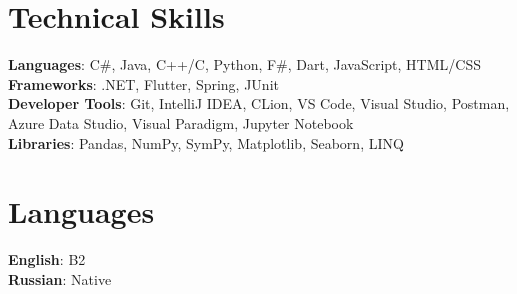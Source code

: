 \documentclass[letterpaper,11pt]{article}
\begin{document}

%
\section{Technical Skills}
 \begin{itemize}[leftmargin=0.15in, label={}]
    \small{\item{
     \textbf{Languages}{: C\#, Java, C++/C, Python, F\#, Dart, JavaScript, HTML/CSS} \\
     \textbf{Frameworks}{: .NET, Flutter, Spring, JUnit} \\
     \textbf{Developer Tools}{: Git, IntelliJ IDEA, CLion, VS Code, Visual Studio, Postman, Azure Data Studio, Visual Paradigm, Jupyter Notebook} \\
     \textbf{Libraries}{: Pandas, NumPy, SymPy, Matplotlib, Seaborn, LINQ}
    }}
 \end{itemize}

\section{Languages}
 \begin{itemize}[leftmargin=0.15in, label={}]
    \small{\item{
     \textbf{English}{: B2} \\
     \textbf{Russian}{: Native}
    }}
 \end{itemize}

\end{document}

